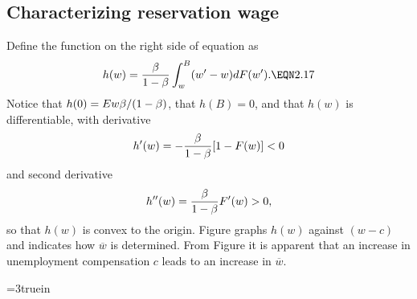 
\subsection{Characterizing reservation wage}
Define the function on the right side of equation  as
$$h(w)={\be\over 1-\be} \int_w^B (w'-w) dF(w').\EQN 2.17$$
Notice that $h(0)= Ew {\beta} /(1-{\beta})$, that $h(B)=0$, and that $h(w)$ is
differentiable, with derivative
$$h'(w) =-{{\beta}\over 1-{\beta}} [1-F(w)]<0$$
and second derivative
$$h^{\prime\prime} (w) ={{\beta}\over 1-{\beta}} F'(w)>0,$$
so that $h(w) $ is convex to the origin.  Figure  %
graphs $h(w)$ against
$(w-c)$ and indicates how $\overline w$ is determined.  From Figure  it is
apparent that an increase in unemployment compensation $c$ leads to an increase in $\overline w$.


\centerline{\epsfxsize=3truein}
\caption{The reservation wage $\overline w$ that satisfies $\overline
w-c=[\be/(1-\be)]\int_{\overline w}^B (w'-\overline w) dF(w')\equiv h(\overline w)$.}
\endfigure

